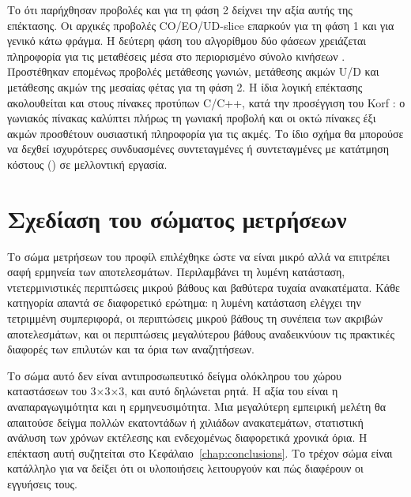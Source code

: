Το ότι παρήχθησαν προβολές και για τη φάση 2 δείχνει την αξία αυτής της επέκτασης. Οι αρχικές προβολές CO/EO/UD-slice επαρκούν για τη φάση 1 και για γενικό κάτω φράγμα. Η δεύτερη φάση του αλγορίθμου δύο φάσεων χρειάζεται πληροφορία για τις μεταθέσεις μέσα στο περιορισμένο σύνολο κινήσεων \cite{kociembaTwoPhase}. Προστέθηκαν επομένως προβολές μετάθεσης γωνιών, μετάθεσης ακμών U/D και μετάθεσης ακμών της μεσαίας φέτας για τη φάση 2. Η ίδια λογική επέκτασης ακολουθείται και στους πίνακες προτύπων C/C++, κατά την προσέγγιση του Korf \cite{korf1997pattern}: ο γωνιακός πίνακας καλύπτει πλήρως τη γωνιακή προβολή και οι οκτώ πίνακες έξι ακμών προσθέτουν ουσιαστική πληροφορία για τις ακμές. Το ίδιο σχήμα θα μπορούσε να δεχθεί ισχυρότερες συνδυασμένες συντεταγμένες ή συντεταγμένες με κατάτμηση κόστους () σε μελλοντική εργασία.

\section{Σχεδίαση του σώματος μετρήσεων}
\label{sec:design-corpus}
Το σώμα μετρήσεων του προφίλ  επιλέχθηκε ώστε να είναι μικρό αλλά να επιτρέπει σαφή ερμηνεία των αποτελεσμάτων. Περιλαμβάνει τη λυμένη κατάσταση, ντετερμινιστικές περιπτώσεις μικρού βάθους και βαθύτερα τυχαία ανακατέματα. Κάθε κατηγορία απαντά σε διαφορετικό ερώτημα: η λυμένη κατάσταση ελέγχει την τετριμμένη συμπεριφορά, οι περιπτώσεις μικρού βάθους τη συνέπεια των ακριβών αποτελεσμάτων, και οι περιπτώσεις μεγαλύτερου βάθους αναδεικνύουν τις πρακτικές διαφορές των επιλυτών και τα όρια των αναζητήσεων.

Το σώμα αυτό δεν είναι αντιπροσωπευτικό δείγμα ολόκληρου του χώρου καταστάσεων του 3×3×3, και αυτό δηλώνεται ρητά. Η αξία του είναι η αναπαραγωγιμότητα και η ερμηνευσιμότητα. Μια μεγαλύτερη εμπειρική μελέτη θα απαιτούσε δείγμα πολλών εκατοντάδων ή χιλιάδων ανακατεμάτων, στατιστική ανάλυση των χρόνων εκτέλεσης και ενδεχομένως διαφορετικά χρονικά όρια. Η επέκταση αυτή συζητείται στο Κεφάλαιο~\ref{chap:conclusions}. Το τρέχον σώμα είναι κατάλληλο για να δείξει ότι οι υλοποιήσεις λειτουργούν και πώς διαφέρουν οι εγγυήσεις τους.

